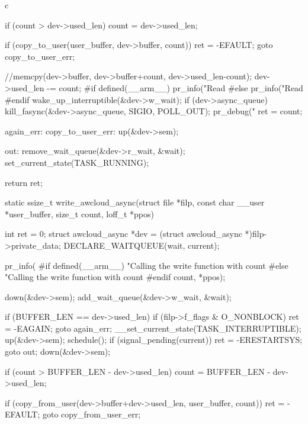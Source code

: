 \begin{code-block}{c}
{        if (count > dev->used_len) {
                count = dev->used_len;
        }

        if (copy_to_user(user_buffer, dev->buffer, count)) {
                ret = -EFAULT;
                goto copy_to_user_err;
        }

        //memcpy(dev->buffer, dev->buffer+count, dev->used_len-count);
        dev->used_len -= count;
#if defined(__arm__)
        pr_info("Read %
#else
        pr_info("Read %
#endif
        wake_up_interruptible(&dev->w_wait);
        if (dev->async_queue) {
                kill_fasync(&dev->async_queue, SIGIO, POLL_OUT);
                pr_debug("%
        }
        ret = count;

again_err:
copy_to_user_err:
        up(&dev->sem);

out:
        remove_wait_queue(&dev->r_wait, &wait);
        set_current_state(TASK_RUNNING);

        return ret;
}

static ssize_t write_awcloud_async(struct file *filp,
        const char __user *user_buffer, size_t count, loff_t *ppos)
{
        int ret = 0;
        struct awcloud_async *dev = (struct awcloud_async *)filp->private_data;
        DECLARE_WAITQUEUE(wait, current);

        pr_info(
#if defined(__arm__)
                "Calling the write function with count %
#else
                "Calling the write function with count %
#endif
                count, *ppos);

        down(&dev->sem);
        add_wait_queue(&dev->w_wait, &wait);

        if (BUFFER_LEN == dev->used_len) {
                if (filp->f_flags & O_NONBLOCK) {
                        ret = -EAGAIN;
                        goto again_err;
                }
                __set_current_state(TASK_INTERRUPTIBLE);
                up(&dev->sem);
                schedule();
                if (signal_pending(current)) {
                        ret = -ERESTARTSYS;
                        goto out;
                }
                down(&dev->sem);
        }

        if (count > BUFFER_LEN - dev->used_len) {
                count = BUFFER_LEN - dev->used_len;
        }

        if (copy_from_user(dev->buffer+dev->used_len, user_buffer, count)) {
                ret = -EFAULT;
                goto copy_from_user_err;
        }

}
\end{code-block}
